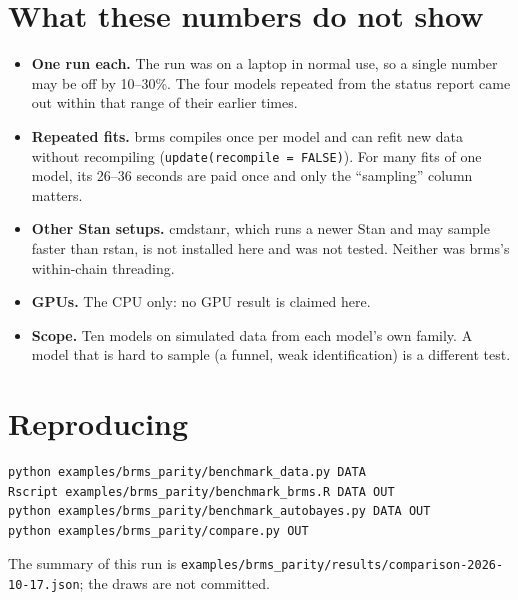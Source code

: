 \documentclass[11pt]{article}
\newcommand{\code}[1]{\texttt{#1}}
\newcommand{\file}[1]{\texttt{#1}}
\begin{document}
\section{What these numbers do not show}

\begin{itemize}
\item \textbf{One run each.} The run was on a laptop in normal use, so a single number may be off by 10--30\%. The four
  models repeated from the status report came out within that range of their earlier times.
\item \textbf{Repeated fits.} brms compiles once per model and can refit new data without recompiling
  (\code{update(recompile = FALSE)}). For many fits of one model, its 26--36 seconds are paid once and only the
  ``sampling'' column matters.
\item \textbf{Other Stan setups.} cmdstanr, which runs a newer Stan and may sample faster than rstan, is not installed
  here and was not tested. Neither was brms's within-chain threading.
\item \textbf{GPUs.} The CPU only: no GPU result is claimed here.
\item \textbf{Scope.} Ten models on simulated data from each model's own family. A model that is hard to sample (a
  funnel, weak identification) is a different test.
\end{itemize}

\section{Reproducing}

\begin{verbatim}
python examples/brms_parity/benchmark_data.py DATA
Rscript examples/brms_parity/benchmark_brms.R DATA OUT
python examples/brms_parity/benchmark_autobayes.py DATA OUT
python examples/brms_parity/compare.py OUT
\end{verbatim}
The summary of this run is \file{examples/brms\_parity/results/comparison-2026-10-17.json}; the draws are not committed.
\end{document}
